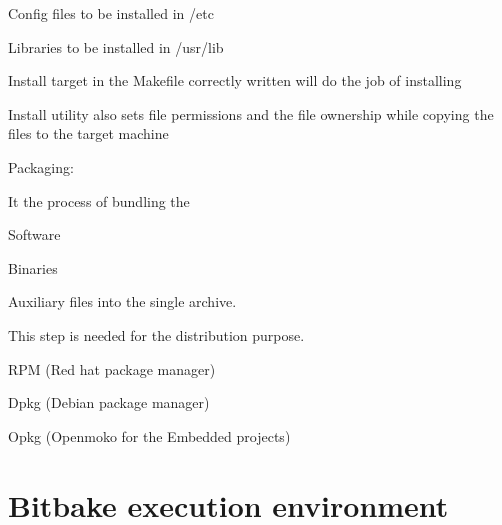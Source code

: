 \begin{DoxyItemize}
\begin{DoxyItemize}
\begin{DoxyItemize}
\item Config files to be installed in /etc
\item Libraries to be installed in /usr/lib
\end{DoxyItemize}
\item Install target in the Makefile correctly written will do the job of installing
\item Install utility also sets file permissions and the file ownership while copying the files to the target machine
\end{DoxyItemize}
\item Packaging\+:
\begin{DoxyItemize}
\item It the process of bundling the
\begin{DoxyItemize}
\item Software
\item Binaries
\item Auxiliary files into the single archive.
\end{DoxyItemize}
\item This step is needed for the distribution purpose.
\begin{DoxyItemize}
\item R\+PM (Red hat package manager)
\item Dpkg (Debian package manager)
\item Opkg (Openmoko for the Embedded projects)
\end{DoxyItemize}
\end{DoxyItemize}
\end{DoxyItemize}

\section*{Bitbake execution environment}


